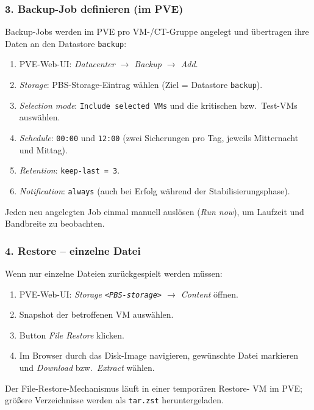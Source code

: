 \subsubsection*{3. Backup-Job definieren (im PVE)}
Backup-Jobs werden im \ac{PVE} pro \ac{VM}-/\ac{CT}-Gruppe angelegt
und übertragen ihre Daten an den Datastore \texttt{backup}:
\begin{enumerate}\setlength{\itemsep}{1pt}
    \item PVE-Web-UI: \emph{Datacenter $\to$ Backup $\to$ Add}.
    \item \emph{Storage}: PBS-Storage-Eintrag wählen
          (Ziel = Datastore \texttt{backup}).
    \item \emph{Selection mode}: \texttt{Include selected VMs} und
          die kritischen bzw.\ Test-\acp{VM} auswählen.
    \item \emph{Schedule}: \texttt{00:00} und \texttt{12:00}
          (zwei Sicherungen pro Tag, jeweils Mitternacht und Mittag).
    \item \emph{Retention}: \texttt{keep-last = 3}.
    \item \emph{Notification}: \texttt{always} (auch bei Erfolg
          während der Stabilisierungsphase).
\end{enumerate}
Jeden neu angelegten Job einmal manuell auslösen (\emph{Run now}),
um Laufzeit und Bandbreite zu beobachten.

\subsubsection*{4. Restore -- einzelne Datei}
Wenn nur einzelne Dateien zurückgespielt werden müssen:
\begin{enumerate}\setlength{\itemsep}{1pt}
    \item PVE-Web-UI: \emph{Storage \texttt{<PBS-storage>} $\to$
          Content} öffnen.
    \item Snapshot der betroffenen \ac{VM} auswählen.
    \item Button \emph{File Restore} klicken.
    \item Im Browser durch das Disk-Image navigieren, gewünschte
          Datei markieren und \emph{Download} bzw.\
          \emph{Extract} wählen.
\end{enumerate}
Der File-Restore-Mechanismus läuft in einer temporären Restore-
\ac{VM} im \ac{PVE}; größere Verzeichnisse werden als
\texttt{tar.zst} heruntergeladen.

